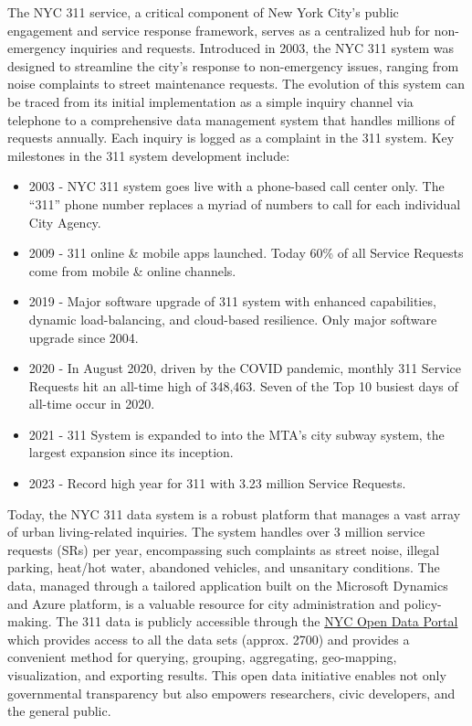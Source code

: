 \documentclass[12pt, titlepage]{article}
\begin{document}
The NYC 311 service, a critical component of New York City's public
engagement and service response framework, serves as a centralized hub
for non-emergency inquiries and requests. Introduced in 2003, the NYC
311 system was designed to streamline the city's response to
non-emergency issues, ranging from noise complaints to street
maintenance requests. The evolution of this system can be traced from
its initial implementation as a simple inquiry channel via telephone to a
comprehensive data management system that handles millions of requests
annually. Each inquiry is logged as a complaint in the 311 system.
Key milestones in the 311 system development include:

\begin{itemize}
 	\item 2003 - NYC 311 system goes live with a phone-based call center only. The ``311'' phone number replaces a myriad of numbers to call for each individual City Agency.
   	\item 2009 - 311 online \& mobile apps launched. Today 60\% of all Service Requests come from mobile \& online channels.
   	\item 2019 - Major software upgrade of 311 system with enhanced capabilities, dynamic load-balancing, and cloud-based resilience. Only major software upgrade since 2004.	
      \item 2020 - In August 2020, driven by the COVID pandemic, monthly 311 Service Requests hit an all-time high of 348,463. Seven of the Top 10 busiest days of all-time occur in 2020.
      \item 2021 - 311 System is expanded to into the MTA's city subway system, the largest expansion since its inception.
   	\item 2023 - Record high year for 311 with 3.23 million Service Requests.
\end{itemize}

Today, the NYC 311 data system is a robust platform that manages a
vast array of urban living-related inquiries. The system handles over 3 million service 
requests (SRs) per year, encompassing such complaints as street noise, illegal parking, heat/hot water, abandoned vehicles,
and unsanitary conditions. The data, managed through a tailored application built on the 
Microsoft Dynamics and Azure platform, is a valuable resource for city
administration and policy-making. The 311 data is publicly accessible through the 
\href{https://opendata.cityofnewyork.us/}{NYC Open Data Portal} which provides access
to all the data sets (approx. 2700) and provides a convenient method for querying, grouping, aggregating, geo-mapping, visualization, and exporting
results. This open data initiative enables not only governmental transparency but also empowers 
researchers, civic developers, and the general public. 
\end{document}
